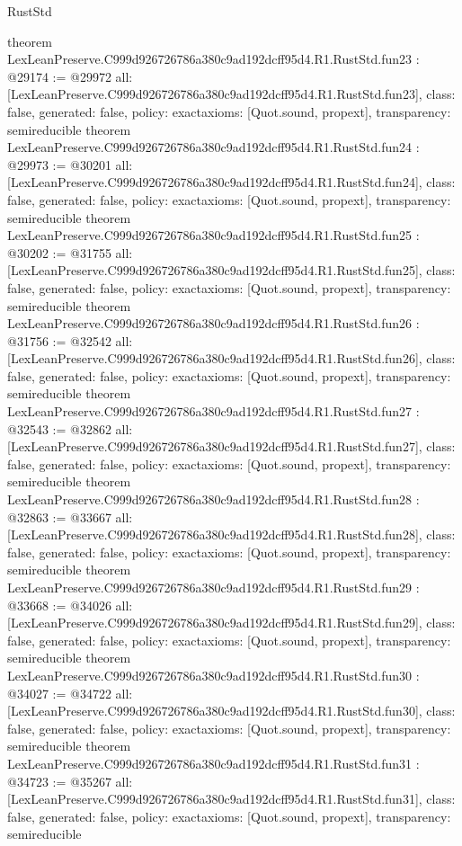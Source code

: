 \begin{lexlean}{RustStd}
\begin{coremodule}
{}
theorem LexLeanPreserve.C999d926726786a380c9ad192dcff95d4.R1.RustStd.fun23 : @29174 := @29972 {
  all: [LexLeanPreserve.C999d926726786a380c9ad192dcff95d4.R1.RustStd.fun23],
  class: false,
  generated: false,
  policy: exact{axioms: [Quot.sound, propext]},
  transparency: semireducible
}
theorem LexLeanPreserve.C999d926726786a380c9ad192dcff95d4.R1.RustStd.fun24 : @29973 := @30201 {
  all: [LexLeanPreserve.C999d926726786a380c9ad192dcff95d4.R1.RustStd.fun24],
  class: false,
  generated: false,
  policy: exact{axioms: [Quot.sound, propext]},
  transparency: semireducible
}
theorem LexLeanPreserve.C999d926726786a380c9ad192dcff95d4.R1.RustStd.fun25 : @30202 := @31755 {
  all: [LexLeanPreserve.C999d926726786a380c9ad192dcff95d4.R1.RustStd.fun25],
  class: false,
  generated: false,
  policy: exact{axioms: [Quot.sound, propext]},
  transparency: semireducible
}
theorem LexLeanPreserve.C999d926726786a380c9ad192dcff95d4.R1.RustStd.fun26 : @31756 := @32542 {
  all: [LexLeanPreserve.C999d926726786a380c9ad192dcff95d4.R1.RustStd.fun26],
  class: false,
  generated: false,
  policy: exact{axioms: [Quot.sound, propext]},
  transparency: semireducible
}
theorem LexLeanPreserve.C999d926726786a380c9ad192dcff95d4.R1.RustStd.fun27 : @32543 := @32862 {
  all: [LexLeanPreserve.C999d926726786a380c9ad192dcff95d4.R1.RustStd.fun27],
  class: false,
  generated: false,
  policy: exact{axioms: [Quot.sound, propext]},
  transparency: semireducible
}
theorem LexLeanPreserve.C999d926726786a380c9ad192dcff95d4.R1.RustStd.fun28 : @32863 := @33667 {
  all: [LexLeanPreserve.C999d926726786a380c9ad192dcff95d4.R1.RustStd.fun28],
  class: false,
  generated: false,
  policy: exact{axioms: [Quot.sound, propext]},
  transparency: semireducible
}
theorem LexLeanPreserve.C999d926726786a380c9ad192dcff95d4.R1.RustStd.fun29 : @33668 := @34026 {
  all: [LexLeanPreserve.C999d926726786a380c9ad192dcff95d4.R1.RustStd.fun29],
  class: false,
  generated: false,
  policy: exact{axioms: [Quot.sound, propext]},
  transparency: semireducible
}
theorem LexLeanPreserve.C999d926726786a380c9ad192dcff95d4.R1.RustStd.fun30 : @34027 := @34722 {
  all: [LexLeanPreserve.C999d926726786a380c9ad192dcff95d4.R1.RustStd.fun30],
  class: false,
  generated: false,
  policy: exact{axioms: [Quot.sound, propext]},
  transparency: semireducible
}
theorem LexLeanPreserve.C999d926726786a380c9ad192dcff95d4.R1.RustStd.fun31 : @34723 := @35267 {
  all: [LexLeanPreserve.C999d926726786a380c9ad192dcff95d4.R1.RustStd.fun31],
  class: false,
  generated: false,
  policy: exact{axioms: [Quot.sound, propext]},
  transparency: semireducible
}
\end{coremodule}
\end{lexlean}
